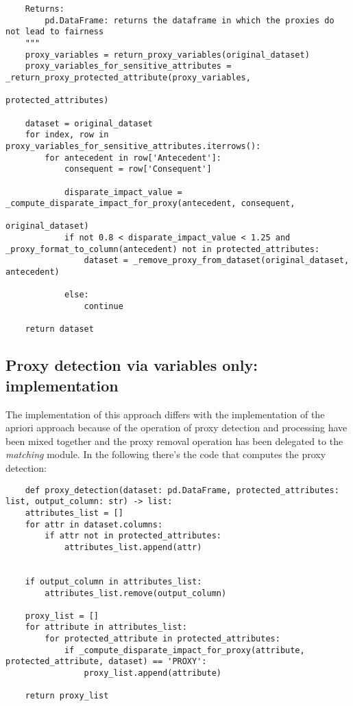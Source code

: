 \documentclass[12pt,a4paper,openright,twoside]{book}
\begin{document}
\begin{enumerate}
\begin{lstlisting}
    Returns:
        pd.DataFrame: returns the dataframe in which the proxies do not lead to fairness
    """
    proxy_variables = return_proxy_variables(original_dataset)
    proxy_variables_for_sensitive_attributes = _return_proxy_protected_attribute(proxy_variables,
                                                                                 protected_attributes)
    
    dataset = original_dataset
    for index, row in proxy_variables_for_sensitive_attributes.iterrows():
        for antecedent in row['Antecedent']:
            consequent = row['Consequent']

            disparate_impact_value = _compute_disparate_impact_for_proxy(antecedent, consequent,
                                                                         original_dataset)
            if not 0.8 < disparate_impact_value < 1.25 and _proxy_format_to_column(antecedent) not in protected_attributes:
                dataset = _remove_proxy_from_dataset(original_dataset, antecedent)

            else:
                continue

    return dataset

    \end{lstlisting}
\end{enumerate}

\subsection{Proxy detection via variables only: implementation}
The implementation of this approach differs with the implementation of the apriori approach because of the operation of proxy detection and processing have been mixed together and the proxy removal operation has been delegated to the \emph{matching} module. In the following there's the code that computes the proxy detection:
\begin{lstlisting}
    def proxy_detection(dataset: pd.DataFrame, protected_attributes: list, output_column: str) -> list:
    attributes_list = []
    for attr in dataset.columns:
        if attr not in protected_attributes:
            attributes_list.append(attr)
            
          
    if output_column in attributes_list:
        attributes_list.remove(output_column)
        
    proxy_list = []
    for attribute in attributes_list:
        for protected_attribute in protected_attributes:
            if _compute_disparate_impact_for_proxy(attribute, protected_attribute, dataset) == 'PROXY':
                proxy_list.append(attribute)

    return proxy_list

\end{lstlisting}
\end{document}
